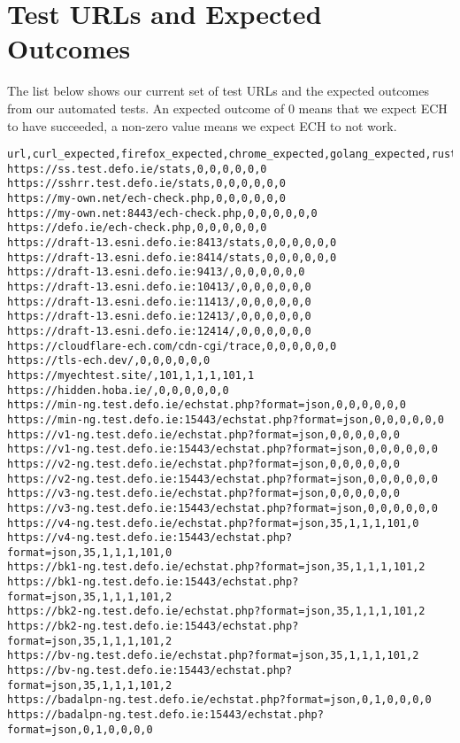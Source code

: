 
\section{Test URLs and Expected Outcomes}
\label{app:urls}

The list below shows our current set of test URLs
and the expected outcomes from our automated tests.
An expected outcome of 0 means that we expect ECH
to have succeeded, a non-zero value means we expect
ECH to not work.

\tiny
\begin{verbatim}
url,curl_expected,firefox_expected,chrome_expected,golang_expected,rust_expected,py_expected
https://ss.test.defo.ie/stats,0,0,0,0,0,0
https://sshrr.test.defo.ie/stats,0,0,0,0,0,0
https://my-own.net/ech-check.php,0,0,0,0,0,0
https://my-own.net:8443/ech-check.php,0,0,0,0,0,0
https://defo.ie/ech-check.php,0,0,0,0,0,0
https://draft-13.esni.defo.ie:8413/stats,0,0,0,0,0,0
https://draft-13.esni.defo.ie:8414/stats,0,0,0,0,0,0
https://draft-13.esni.defo.ie:9413/,0,0,0,0,0,0
https://draft-13.esni.defo.ie:10413/,0,0,0,0,0,0
https://draft-13.esni.defo.ie:11413/,0,0,0,0,0,0
https://draft-13.esni.defo.ie:12413/,0,0,0,0,0,0
https://draft-13.esni.defo.ie:12414/,0,0,0,0,0,0
https://cloudflare-ech.com/cdn-cgi/trace,0,0,0,0,0,0
https://tls-ech.dev/,0,0,0,0,0,0
https://myechtest.site/,101,1,1,1,101,1
https://hidden.hoba.ie/,0,0,0,0,0,0
https://min-ng.test.defo.ie/echstat.php?format=json,0,0,0,0,0,0
https://min-ng.test.defo.ie:15443/echstat.php?format=json,0,0,0,0,0,0
https://v1-ng.test.defo.ie/echstat.php?format=json,0,0,0,0,0,0
https://v1-ng.test.defo.ie:15443/echstat.php?format=json,0,0,0,0,0,0
https://v2-ng.test.defo.ie/echstat.php?format=json,0,0,0,0,0,0
https://v2-ng.test.defo.ie:15443/echstat.php?format=json,0,0,0,0,0,0
https://v3-ng.test.defo.ie/echstat.php?format=json,0,0,0,0,0,0
https://v3-ng.test.defo.ie:15443/echstat.php?format=json,0,0,0,0,0,0
https://v4-ng.test.defo.ie/echstat.php?format=json,35,1,1,1,101,0
https://v4-ng.test.defo.ie:15443/echstat.php?format=json,35,1,1,1,101,0
https://bk1-ng.test.defo.ie/echstat.php?format=json,35,1,1,1,101,2
https://bk1-ng.test.defo.ie:15443/echstat.php?format=json,35,1,1,1,101,2
https://bk2-ng.test.defo.ie/echstat.php?format=json,35,1,1,1,101,2
https://bk2-ng.test.defo.ie:15443/echstat.php?format=json,35,1,1,1,101,2
https://bv-ng.test.defo.ie/echstat.php?format=json,35,1,1,1,101,2
https://bv-ng.test.defo.ie:15443/echstat.php?format=json,35,1,1,1,101,2
https://badalpn-ng.test.defo.ie/echstat.php?format=json,0,1,0,0,0,0
https://badalpn-ng.test.defo.ie:15443/echstat.php?format=json,0,1,0,0,0,0

\end{verbatim}
